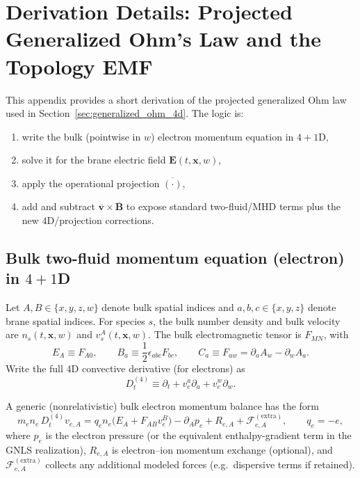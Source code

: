 \documentclass[11pt]{article}
\begin{document}
\section{Derivation Details: Projected Generalized Ohm's Law and the Topology EMF}
\label{app:ohm_projection}

This appendix provides a short derivation of the projected generalized Ohm law used in
Section~\ref{sec:generalized_ohm_4d}. The logic is:

\begin{enumerate}[leftmargin=1.6em]
\item write the bulk (pointwise in \(w\)) electron momentum equation in \(4+1\)D,
\item solve it for the brane electric field \(\mathbf{E}(t,\mathbf{x},w)\),
\item apply the operational projection \(\overline{(\cdot)}\),
\item add and subtract \(\overline{\mathbf{v}}\times\overline{\mathbf{B}}\) to expose standard
two-fluid/MHD terms plus the new \(4\)D/projection corrections.
\end{enumerate}

\subsection{Bulk two-fluid momentum equation (electron) in \(4+1\)D}
\label{app:ohm_bulk}

Let \(A,B\in\{x,y,z,w\}\) denote bulk spatial indices and \(a,b,c\in\{x,y,z\}\) denote
brane spatial indices. For species \(s\), the bulk number density and bulk velocity are
\(n_s(t,\mathbf{x},w)\) and \(v_s^A(t,\mathbf{x},w)\). The bulk electromagnetic tensor is
\(F_{MN}\), with
\begin{equation}
E_A \equiv F_{A0},\qquad
B_a \equiv \frac12\epsilon_{abc}F_{bc},\qquad
C_a \equiv F_{aw}=\partial_a A_w-\partial_w A_a.
\label{eq:app_EBC_defs}
\end{equation}
Write the full \(4\)D convective derivative (for electrons) as
\begin{equation}
D_t^{(4)} \equiv \partial_t + v_e^a\partial_a + v_e^w\partial_w.
\label{eq:app_Dt4}
\end{equation}

A generic (nonrelativistic) bulk electron momentum balance has the form
\begin{equation}
m_e n_e\,D_t^{(4)} v_{e,A}
=
q_e n_e\Big(E_A + F_{AB}v_e^B\Big)
-\partial_A p_e
+R_{e,A}
+\mathcal{F}^{(\mathrm{extra})}_{e,A},
\qquad q_e=-e,
\label{eq:app_euler_e_bulk}
\end{equation}
where \(p_e\) is the electron pressure (or the equivalent enthalpy-gradient term in the GNLS
realization), \(R_{e,A}\) is electron--ion momentum exchange (optional), and
\(\mathcal{F}^{(\mathrm{extra})}_{e,A}\) collects any additional modeled forces (e.g.\ dispersive
terms if retained).
\end{document}
